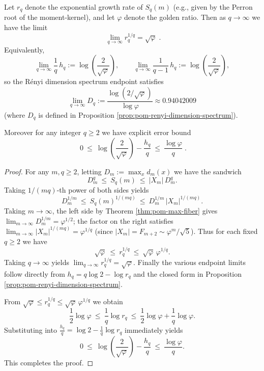 \begin{proposition}\label{prop:pom-rq-qinfty-endpoint}
Let \(r_q\) denote the exponential growth rate of \(S_q(m)\) (e.g., given by the Perron root of the moment-kernel), and let \(\varphi\) denote the golden ratio.
Then as \(q\to\infty\) we have the limit
\[
\boxed{\;
\lim_{q\to\infty} r_q^{1/q}=\sqrt{\varphi}\; }.
\]
Equivalently,
\[
\lim_{q\to\infty}\frac{1}{q}\,h_q
:=\log\!\left(\frac{2}{\sqrt{\varphi}}\right),
\qquad
\lim_{q\to\infty}\frac{1}{q-1}\,h_q
:=\log\!\left(\frac{2}{\sqrt{\varphi}}\right),
\]
so the Rényi dimension spectrum endpoint satisfies
\[
\lim_{q\to\infty}D_q
:=\frac{\log\!\left(2/\sqrt{\varphi}\right)}{\log\varphi}
\approx 0.94042009
\]
(where \(D_q\) is defined in Proposition \ref{prop:pom-renyi-dimension-spectrum}).
\par
Moreover for any integer \(q\ge 2\) we have explicit error bound
\[
\boxed{\;
0\ \le\ \log\!\left(\frac{2}{\sqrt{\varphi}}\right)-\frac{h_q}{q}\ \le\ \frac{\log\varphi}{q}\; }.
\]
\end{proposition}
\begin{proof}
For any \(m,q\ge 2\), letting
\(
D_m:=\max_x d_m(x)
\)
we have the sandwich
\[
D_m^q\ \le\ S_q(m)\ \le\ |X_m|\,D_m^q.
\]
Taking \(1/(mq)\)-th power of both sides yields
\[
D_m^{1/m}\ \le\ S_q(m)^{1/(mq)}\ \le\ D_m^{1/m}\,|X_m|^{1/(mq)}.
\]
Taking \(m\to\infty\), the left side by Theorem \ref{thm:pom-max-fiber} gives
\(
\lim_{m\to\infty}D_m^{1/m}=\varphi^{1/2}
\);
the factor on the right satisfies
\(
\lim_{m\to\infty}|X_m|^{1/(mq)}=\varphi^{1/q}
\)
(since \(|X_m|=F_{m+2}\sim \varphi^m/\sqrt5\)).
Thus for each fixed \(q\ge 2\) we have
\[
\sqrt{\varphi}\ \le\ r_q^{1/q}\ \le\ \sqrt{\varphi}\,\varphi^{1/q}.
\]
Taking \(q\to\infty\) yields \(\lim_{q\to\infty}r_q^{1/q}=\sqrt{\varphi}\).
Finally the various endpoint limits follow directly from \(h_q=q\log 2-\log r_q\) and the closed form in Proposition \ref{prop:pom-renyi-dimension-spectrum}.
\par
From \(\sqrt{\varphi}\le r_q^{1/q}\le \sqrt{\varphi}\,\varphi^{1/q}\) we obtain
\[
\frac{1}{2}\log\varphi\ \le\ \frac{1}{q}\log r_q\ \le\ \frac{1}{2}\log\varphi+\frac{1}{q}\log\varphi.
\]
Substituting into \(\frac{h_q}{q}=\log 2-\frac{1}{q}\log r_q\) immediately yields
\[
0\ \le\ \log\!\left(\frac{2}{\sqrt{\varphi}}\right)-\frac{h_q}{q}\ \le\ \frac{\log\varphi}{q}.
\]
This completes the proof.
\end{proof}

